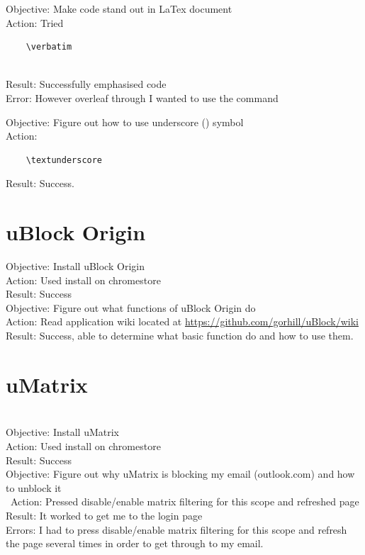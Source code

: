 \documentclass{article}
\begin{document}
Objective: Make code stand out in LaTex document\\
Action: Tried \begin{verbatim}
    \verbatim
\end{verbatim}\\
Result: Successfully emphasised code\\
Error: However overleaf through I wanted to use the command\newline

Objective: Figure out how to use underscore (\textunderscore ) symbol\\
Action: \begin{verbatim}
    \textunderscore 
\end{verbatim}
Result: Success.

\section{uBlock Origin}

Objective: Install uBlock Origin\\
Action: Used install on chromestore\\
Result: Success\\

Objective: Figure out what functions of uBlock Origin do\\
Action: Read application wiki located at \href{https://github.com/gorhill/uBlock/wiki}{https://github.com/gorhill/uBlock/wiki} 
Result: Success, able to determine what basic function do and how to use them.

\section{uMatrix}\\
Objective: Install uMatrix \\
Action: Used install on chromestore\\
Result: Success\\

Objective: Figure out why uMatrix is blocking my email (outlook.com) and how to unblock it\\\
Action: Pressed disable/enable matrix filtering for this scope and refreshed page\\
Result: It worked to get me to the login page\\
Errors: I had to press disable/enable matrix filtering for this scope and refresh the page several times in order to get through to my email. \\
\end{document}
